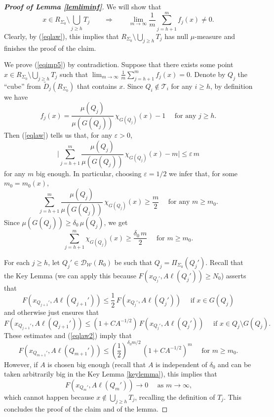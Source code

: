 \documentclass[11pt]{amsart}
\newcommand{\DD}{{\mathcal D}}
\newcommand{\WW}{{\mathcal W}}
\newcommand{\TT}{{\mathcal T}}
\newcommand{\rf}[1]{{(\ref{#1})}}
\newcommand{\ve}{{\varepsilon}}
\newcommand{\vv}{{\vspace{2mm}}}
\newcommand{\wt}[1]{{\widetilde{#1}}}
\theoremstyle{definition}
\theoremstyle{remark}
\numberwithin{equation}{section}
\begin{document}
\begin{proof}[\bf Proof of Lemma \ref{lemliminf}]
We will show that 
\begin{equation}\label{eqimp5}
x\in R_{\Sigma_0}\setminus \bigcup_{j\geq h} T_j\qquad \Rightarrow\qquad\lim_{m\to\infty} \frac1m \sum_{j= h+1}^m f_j(x) \neq 0.
\end{equation}
Clearly, by \rf{eqlaw}, this implies that 
$R_{\Sigma_0}\setminus \bigcup_{j\geq h} T_j$ has null $\mu$-measure and finishes the proof of the claim.

We prove \rf{eqimp5} by contradiction. Suppose that there exists some point
$x\in R_{\Sigma_0}\setminus \bigcup_{j\geq h} T_j$ such that $\lim_{m\to\infty} \frac1m \sum_{j= h+1}^m f_j(x) = 0$.
Denote by $Q_j$ the ``cube'' from $\wt D_j(R_{\Sigma_0})$ that contains $x$. Since $Q_i\not\in \TT_i$
for any $i\geq h$, by definition we have
$$f_j(x) = \frac{\mu(Q_j)}{\mu(G(Q_j))}\,\chi_{G(Q_j)}(x) - 1\quad\mbox{ for any $j\geq h$.}$$
Then \rf{eqlaw} tells us that, for any $\ve>0$, 
$$\bigg| \sum_{j= h+1}^m  \frac{\mu(Q_j)}{\mu(G(Q_j))}\,\chi_{G(Q_j)}(x) - m\bigg|\leq \ve\,m$$
for any $m$ big enough. In particular, choosing $\ve=1/2$ we infer that, for some $m_0=m_0(x)$,
$$\sum_{j= h+1}^m  \frac{\mu(Q_j)}{\mu(G(Q_j))}\,\chi_{G(Q_j)}(x)\geq \frac m2
\quad\mbox{ for any $m\geq m_0$.}$$
Since $\mu(G(Q_j))\geq \delta_0\,\mu(Q_j)$, we get
\begin{equation}\label{eqlaw2}
\sum_{j= h+1}^m \chi_{G(Q_j)}(x)\geq  \frac{\delta_0\,m}2 \quad\mbox{ for $m\geq m_0$.}
\end{equation}

For each $j\geq h$, let $Q_j'\in\DD_\WW(R_0)$ be such that $Q_j=\Pi_{\Sigma_0}(Q_j')$.
Recall that the Key Lemma (we can apply this because $F(x_{Q_j'},A\ell(Q_j'))\geq N_0$)
asserts that
$$F(x_{Q_{j+1}'},A\ell(Q_{j+1}'))\leq \frac12\,F(x_{Q_j'},A\ell(Q_j')) \quad\mbox{ if $x\in G(Q_j)$}$$
and otherwise just ensures that
$$F(x_{Q_{j+1}'},A\ell(Q_{j+1}'))\leq (1+CA^{-1/2})\,F(x_{Q_j'},A\ell(Q_j')) \quad\mbox{ if $x\in Q_j\setminus G(Q_j)$}.$$
These estimates and \rf{eqlaw2} imply that
$$F(x_{Q_{m+1}'},A\ell(Q_{m+1}'))\leq \left(\frac12\right)^{\delta_0m/2} \,(1+CA^{-1/2})^m
\quad\mbox{ for $m\geq m_0$.}$$
However, if $A$ is chosen big enough (recall that $A$ is independent of $\delta_0$ and can be taken
arbitrarily big in the Key Lemma \ref{keylemma}), this implies that
$$F(x_{Q_{m}'},A\ell(Q_{m}'))\to 0\quad\mbox{ as $m\to\infty$,}$$
which cannot happen because $x\not\in  \bigcup_{j\geq h} T_j$, recalling the definition of $T_j$.
This concludes the proof of the claim and of the lemma.
\end{proof}
\vv
\end{document}
